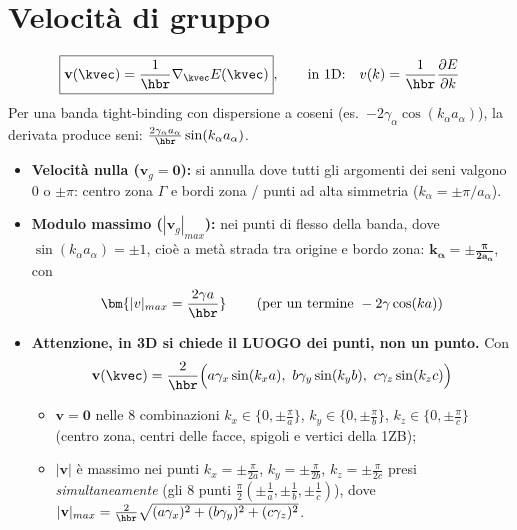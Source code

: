 \newpage

\section{Velocità di gruppo}
\[ \boxed{\mathbf{v}(\kvec) = \frac{1}{\hbr}\nabla_\kvec E(\kvec)}, \qquad\text{in 1D:}\quad v(k)=\frac{1}{\hbr}\frac{\partial E}{\partial k} \]
Per una banda tight-binding con dispersione a coseni (es.\ $-2\gamma_\alpha\cos(k_\alpha a_\alpha)$), la derivata produce seni: $\frac{2\gamma_\alpha a_\alpha}{\hbr}\sin(k_\alpha a_\alpha)$.
\begin{itemize}
    \item \textbf{Velocità nulla ($\mathbf{v}_g=\mathbf{0}$):} si annulla dove tutti gli argomenti dei seni valgono $0$ o $\pm\pi$: centro zona $\Gamma$ e bordi zona / punti ad alta simmetria ($k_\alpha=\pm\pi/a_\alpha$).
    \item \textbf{Modulo massimo ($|\mathbf{v}_g|_{max}$):} nei punti di flesso della banda, dove $\sin(k_\alpha a_\alpha)=\pm1$, cioè a metà strada tra origine e bordo zona: $\bm{k_\alpha = \pm\frac{\pi}{2a_\alpha}}$, con
    \[ \bm{|v|_{max} = \frac{2\gamma a}{\hbr}} \qquad\left(\text{per un termine } -2\gamma\cos(ka)\right) \]
    \item \textbf{Attenzione, in 3D si chiede il LUOGO dei punti, non un punto.} Con
    \[ \mathbf{v}(\kvec)=\frac{2}{\hbr}\Big(a\gamma_x\sin(k_xa),\ b\gamma_y\sin(k_yb),\ c\gamma_z\sin(k_zc)\Big) \]
    \begin{itemize}
      \item $\mathbf{v}=\mathbf{0}$ nelle 8 combinazioni $k_x\in\{0,\pm\frac\pi a\}$, $k_y\in\{0,\pm\frac\pi b\}$, $k_z\in\{0,\pm\frac\pi c\}$ (centro zona, centri delle facce, spigoli e vertici della 1ZB);
      \item $|\mathbf{v}|$ è massimo nei punti $k_x=\pm\frac{\pi}{2a}$, $k_y=\pm\frac{\pi}{2b}$, $k_z=\pm\frac{\pi}{2c}$ presi \emph{simultaneamente} (gli 8 punti $\frac{\pi}{2}(\pm\frac1a,\pm\frac1b,\pm\frac1c)$), dove $|\mathbf{v}|_{max}=\frac{2}{\hbr}\sqrt{(a\gamma_x)^2+(b\gamma_y)^2+(c\gamma_z)^2}$.
    \end{itemize}
\end{itemize}

\vspace{0.3cm}

